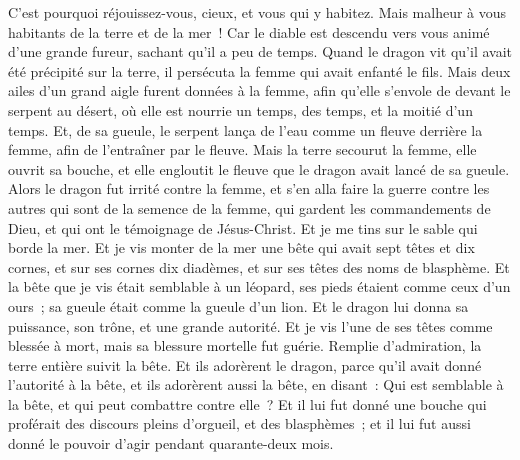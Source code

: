 \begin{multicols}{2}
C'est pourquoi réjouissez-vous, cieux, et vous qui y habitez. Mais malheur à vous habitants de la terre et de la mer~! Car le diable est descendu vers vous animé d'une grande fureur, sachant qu'il a peu de temps.
Quand le dragon vit qu'il avait été précipité sur la terre, il persécuta la femme qui avait enfanté le fils.
Mais deux ailes d'un grand aigle furent données à la femme, afin qu'elle s'envole de devant le serpent au désert, où elle est nourrie un temps, des temps, et la moitié d'un temps.
Et, de sa gueule, le serpent lança de l'eau comme un fleuve derrière la femme, afin de l'entraîner par le fleuve.
Mais la terre secourut la femme, elle ouvrit sa bouche, et elle engloutit le fleuve que le dragon avait lancé de sa gueule.
Alors le dragon fut irrité contre la femme, et s'en alla faire la guerre contre les autres qui sont de la semence de la femme, qui gardent les commandements de Dieu, et qui ont le témoignage de Jésus-Christ.
Et je me tins sur le sable qui borde la mer.
\VerseOne{}Et je vis monter de la mer une bête qui avait sept têtes et dix cornes, et sur ses cornes dix diadèmes, et sur ses têtes des noms de blasphème.
Et la bête que je vis était semblable à un léopard, ses pieds étaient comme ceux d'un ours~; sa gueule était comme la gueule d'un lion. Et le dragon lui donna sa puissance, son trône, et une grande autorité.
Et je vis l'une de ses têtes comme blessée à mort, mais sa blessure mortelle fut guérie. Remplie d'admiration, la terre entière suivit la bête.
Et ils adorèrent le dragon, parce qu'il avait donné l'autorité à la bête, et ils adorèrent aussi la bête, en disant~: Qui est semblable à la bête, et qui peut combattre contre elle~?
Et il lui fut donné une bouche qui proférait des discours pleins d'orgueil, et des blasphèmes~; et il lui fut aussi donné le pouvoir d'agir pendant quarante-deux mois.

\end{multicols}
